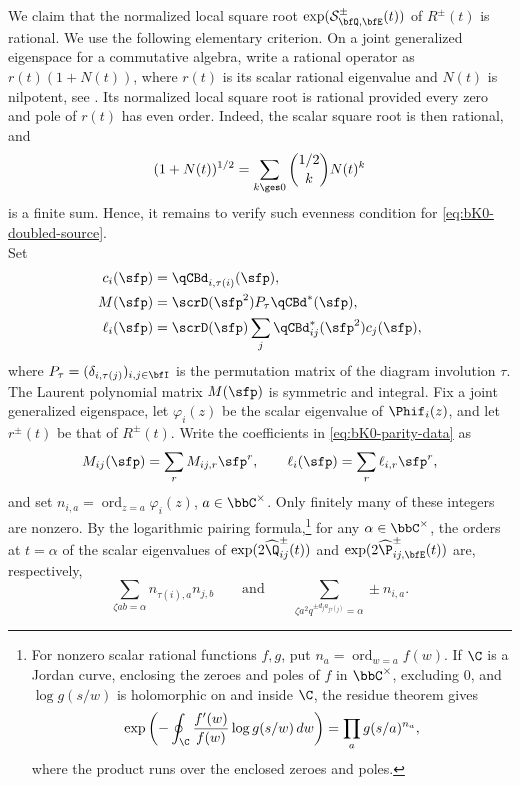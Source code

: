 \documentclass[reqno]{amsart}
\numberwithin{equation}{section}
\begin{document}
We claim that the normalized local square root
$\exp(\mathcal S_{\bfQ,\bfE}^\pm(t))$ of $R^\pm(t)$ is rational. We
use the following elementary criterion. On a joint generalized
eigenspace for a commutative algebra, write a rational operator as
$r(t)(1+N(t))$, where $r(t)$ is its scalar rational eigenvalue and $N(t)$ is
nilpotent, see \cite[Lem. 4.12]{gautam-toledano-16}. Its normalized local square root is rational provided every
zero and pole of $r(t)$ has even order. Indeed, the scalar square root
is then rational, and
\[
(1+N(t))^{1/2}
=
\sum_{k\ges0}\binom{1/2}{k}N(t)^k
\]
is a finite sum. Hence, it remains to verify such evenness condition for \eqref{eq:bK0-doubled-source}.\\

Set
\begin{equation}\label{eq:bK0-parity-data}
\begin{aligned}
	c_i(\sfp)&=\qCBd_{i,\tau(i)}(\sfp),\\
	M(\sfp)&=\scrD(\sfp^2)P_\tau\qCBd^*(\sfp),\\
	\ell_i(\sfp)&=\scrD(\sfp)
	\sum_j\qCBd^*_{ij}(\sfp^2)c_j(\sfp),
\end{aligned}
\end{equation}
where $P_\tau=(\delta_{i,\tau(j)})_{i,j\in\bfI}$ is the permutation
matrix of the diagram involution $\tau$.
The Laurent polynomial matrix $M(\sfp)$ is symmetric and integral.
Fix a joint generalized eigenspace, let $\varphi_i(z)$ be the scalar
eigenvalue of $\Phif_i(z)$, and let $r^\pm(t)$ be that of $R^\pm(t)$.
Write the coefficients in
\eqref{eq:bK0-parity-data} as
\[
M_{ij}(\sfp)=\sum_r M_{ij,r}\sfp^r,
\qquad
\ell_i(\sfp)=\sum_r\ell_{i,r}\sfp^r,
\]
and set $n_{i,a}=\operatorname{ord}_{z=a}\varphi_i(z)$, $a\in\bbC^\times$.
Only finitely many of these integers are nonzero. By the
logarithmic pairing formula,\footnote{For nonzero scalar rational
		functions $f,g$, put $n_a=\operatorname{ord}_{w=a}f(w)$. If $\C$ is
		a Jordan curve, enclosing the zeroes and poles of $f$ in $\bbC^\times$,
		excluding $0$, and $\log g(s/w)$ is holomorphic on and inside $\C$,
		the residue theorem gives
		\[
		\exp\left(-\oint_{\C}\frac{f'(w)}{f(w)}\log g(s/w)\,dw\right)
		=\prod_a g(s/a)^{n_a},
		\]
		where the product runs over the enclosed zeroes and poles.} 
for any $\alpha\in\bbC^\times$,
the orders at $t=\alpha$ of the scalar eigenvalues of
$\exp(2\widehat\Q_{ij}^\pm(t))$ and
$\exp(2\widehat\P_{ij,\bfE}^\pm(t))$ are, respectively,
\[
\sum_{\zeta ab=\alpha}n_{\tau(i),a}n_{j,b}
\qquad\text{and}\qquad
\sum_{\zeta a^2q^{\pm d_ja_{j\tau(j)}}=\alpha}\pm n_{i,a}.
\]
\end{document}
